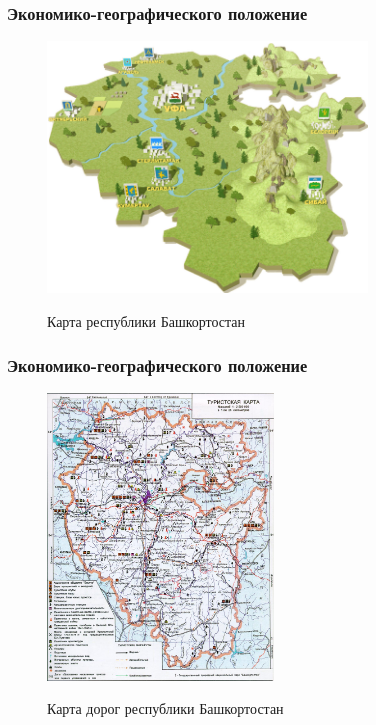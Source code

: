 \begin{frame}
\frametitle{Экономико-географического положение}

\begin{figure}[h!]
	\begin{center}
		{\includegraphics[width=85mm]{pics/alina/map.png}}
		\caption{Карта республики Башкортостан}
	\end{center}
\end{figure}

\end{frame}

\begin{frame}
\frametitle{Экономико-географического положение}

\begin{figure}[h!]
	\begin{center}
		{\includegraphics[width=60mm]{pics/alina/doroga.jpg}}
		\caption{Карта дорог республики Башкортостан}
	\end{center}
\end{figure}

\end{frame}

